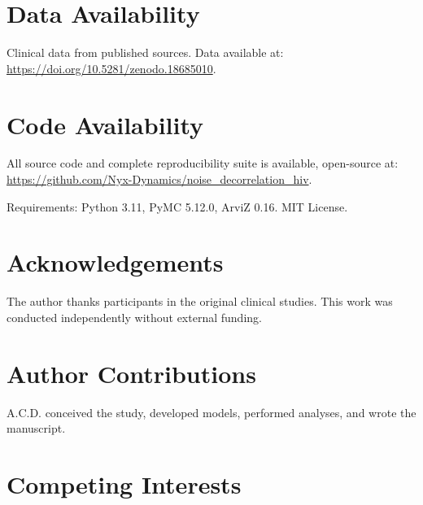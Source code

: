 \documentclass[10pt,a4paper]{article}
\begin{document}
\section*{Data Availability}

Clinical data from published sources\cite{sailasuta2012,young2014,valcour2012}. Data available at: \url{https://doi.org/10.5281/zenodo.18685010}.

\section*{Code Availability}

All source code and complete reproducibility suite is available, open-source at: \url{https://github.com/Nyx-Dynamics/noise_decorrelation_hiv}.

Requirements:
Python 3.11, PyMC 5.12.0, ArviZ 0.16. MIT License.

\section*{Acknowledgements}

The author thanks participants in the original clinical studies. This work was conducted independently without external funding.

\section*{Author Contributions}

A.C.D. conceived the study, developed models, performed analyses, and wrote the manuscript.

\section*{Competing Interests}
\end{document}
